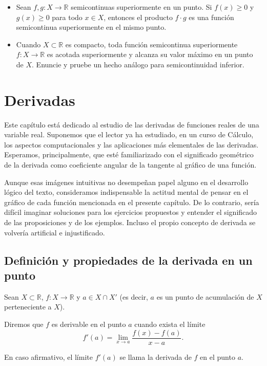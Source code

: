 \documentclass[12pt,oneside]{book}
\begin{document}
\begin{itemize}
    \item[i)] Sean \(f, g: X \to \mathbb{R}\) semicontinuas superiormente en un punto. Si \(f(x) \geq 0\) y \(g(x) \geq 0\) para todo \(x \in X\), entonces el producto \(f \cdot g\) es una función semicontinua superiormente en el mismo punto.
    \item[j)] Cuando \(X \subset \mathbb{R}\) es compacto, toda función semicontinua superiormente \(f: X \to \mathbb{R}\) es acotada superiormente y alcanza su valor máximo en un punto de \(X\). Enuncie y pruebe un hecho análogo para semicontinuidad inferior.
\end{itemize}

\newpage

\chapter{Derivadas}

Este capítulo está dedicado al estudio de las derivadas de funciones reales de una variable real. Suponemos que el lector ya ha estudiado, en un curso de Cálculo, los aspectos computacionales y las aplicaciones más elementales de las derivadas. Esperamos, principalmente, que esté familiarizado con el significado geométrico de la derivada como coeficiente angular de la tangente al gráfico de una función.

Aunque esas imágenes intuitivas no desempeñan papel alguno en el desarrollo lógico del texto, consideramos indispensable la actitud mental de pensar en el gráfico de cada función mencionada en el presente capítulo. De lo contrario, sería difícil imaginar soluciones para los ejercicios propuestos y entender el significado de las proposiciones y de los ejemplos. Incluso el propio concepto de derivada se volvería artificial e injustificado.

\section{Definición y propiedades de la derivada en un punto}

Sean \( X \subset \mathbb{R} \), \( f : X \to \mathbb{R} \) y \( a \in X \cap X' \) (es decir, \( a \) es un punto de acumulación de \( X \) perteneciente a \( X \)).

Diremos que \( f \) es derivable en el punto \( a \) cuando exista el límite
\[
f'(a) = \lim_{x \to a} \frac{f(x) - f(a)}{x - a}.
\]

En caso afirmativo, el límite \( f'(a) \) se llama la derivada de \( f \) en el punto \( a \).
\end{document}
